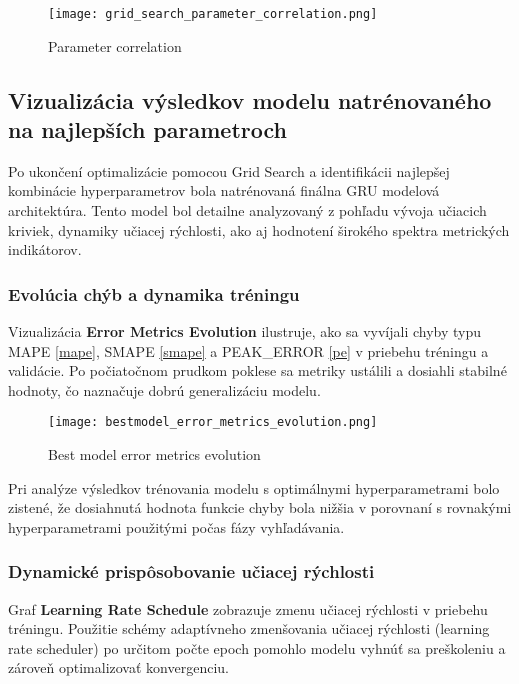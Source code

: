 \begin{figure}[ht!]
\centering
\texttt{[image: grid\_search\_parameter\_correlation.png]}
\caption{Parameter correlation}
\label{fig:grid_search_parameter_correlation}
\end{figure}

\subsection{Vizualizácia výsledkov modelu natrénovaného na najlepších parametroch}

Po ukončení optimalizácie pomocou Grid Search a identifikácii najlepšej kombinácie hyperparametrov bola natrénovaná finálna GRU modelová architektúra. Tento model bol detailne analyzovaný z pohľadu vývoja učiacich kriviek, dynamiky učiacej rýchlosti, ako aj hodnotení širokého spektra metrických indikátorov.

\subsubsection{Evolúcia chýb a dynamika tréningu}

Vizualizácia \textbf{Error Metrics Evolution} ilustruje, ako sa vyvíjali chyby typu MAPE \ref{mape}, SMAPE \ref{smape} a PEAK\_ERROR \ref{pe} v priebehu tréningu a validácie. Po počiatočnom prudkom poklese sa metriky ustálili a dosiahli stabilné hodnoty, čo naznačuje dobrú generalizáciu modelu.

\begin{figure}[ht!]
\centering
\texttt{[image: bestmodel\_error\_metrics\_evolution.png]}
\caption{Best model error metrics evolution}
\label{fig:bestmodel_error_metrics_evolution}
\end{figure}

Pri analýze výsledkov trénovania modelu s optimálnymi hyperparametrami bolo zistené, že dosiahnutá hodnota funkcie chyby bola nižšia v porovnaní s rovnakými hyperparametrami použitými počas fázy vyhľadávania.

\subsubsection{Dynamické prispôsobovanie učiacej rýchlosti}

Graf \textbf{Learning Rate Schedule} zobrazuje zmenu učiacej rýchlosti v priebehu tréningu. Použitie schémy adaptívneho zmenšovania učiacej rýchlosti (learning rate scheduler) po určitom počte epoch pomohlo modelu vyhnúť sa preškoleniu a zároveň optimalizovať konvergenciu.

